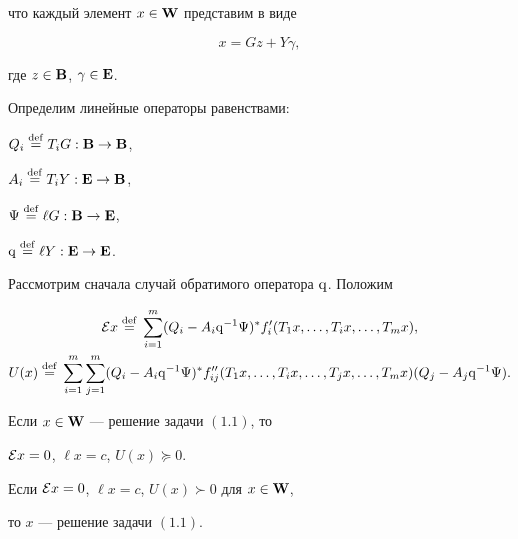 что каждый элемент $x\in\bold W{}$ представим в виде


\begin{equation}


x=Gz+Y\gamma,


\end{equation}


где $z\in\bold B{}$, $\gamma\in\bold E{}$.





Определим линейные операторы равенствами:


$Q_i\overset{\mathrm{def}}{=}{} T_iG:\bold B{}\to\bold B{}$,


$A_i\overset{\mathrm{def}}{=}{} T_i Y :\bold E{}\to\bold B{}$,


$\Psi \overset{\mathrm{def}}{=}{}\ell G:\bold B{}\to\bold E{}$,


$\mathrm{q}\overset{\mathrm{def}}{=}{}\ell Y :\bold E{}\to\bold E{}$.





Рассмотрим сначала случай обратимого оператора $\mathrm{q}$. Положим


\begin{gather*}


{\cal E}x\eqdef\sum_{i=1}^m(Q_i-A_i\q^{-1}\Psi)^*


f'_i(T_1x,\dotsc,T_ix,\dotsc,T_mx), \\


U(x)\eqdef\sum_{i=1}^m\sum_{j=1}^m(Q_i-A_i\q^{-1}\Psi)^*


f''_{ij}(T_1x,\dotsc,T_ix,\dotsc,T_jx,\dotsc,T_mx)(Q_j-A_j\q^{-1}\Psi).


\end{gather*}





\begin{thm} Если $x\in\bold W{}$ --- решение задачи $(1.1)$, то


${\cal E}x=0$, $\ell x=c$, $U(x)\succeq0$.


Если ${\cal E}x=0$, $\ell x=c$, $U(x)\succ0$ для $x\in\bold W{}$,


то $x$ --- решение задачи $(1.1)$.


\end{thm}





